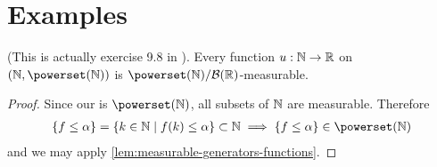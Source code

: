 \section{Examples}

\begin{eg}
	(This is actually exercise 9.8 in \cite[p. 79]{schilling2017}).
	Every function $u: \mathbb{N} \to \mathbb{R}$ on $(\N, \powerset(\N))$ is $\powerset(\N)/\borel(\R)$-measurable.
\end{eg}

\begin{proof}
	Since our \siga is $\powerset(\N)$, all subsets of $\mathbb{N}$ are measurable. Therefore
	\begin{align*}
		\{f \leq \alpha\} = \{k \in \N \mid f(k) \leq \alpha\} \subset \N \implies \{f \leq \alpha\} \in \powerset(\N)
	\end{align*}
	and we may apply \autoref{lem:measurable-generators-functions}.
\end{proof}
